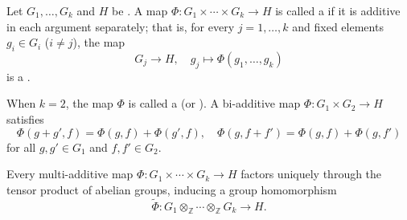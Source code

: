 \begin{definition} \label{definition:multi_additive_map_of_abelian_groups}
    Let $G_1, \ldots, G_k$ and $H$ be . A map $\Phi: G_1 \times \cdots \times G_k \to H$ is called a  if it is additive in each argument separately; that is, for every $j = 1,\ldots,k$ and fixed elements $g_i \in G_i$ ($i \neq j$), the map
    $$G_j \to H, \quad g_j \mapsto \Phi(g_1, \ldots, g_k)$$
    is a .

    When $k = 2$, the map $\Phi$ is called a  (or ). A bi-additive map $\Phi: G_1 \times G_2 \to H$ satisfies
    $$\Phi(g + g', f) = \Phi(g, f) + \Phi(g', f), \quad \Phi(g, f + f') = \Phi(g, f) + \Phi(g, f')$$
    for all $g, g' \in G_1$ and $f, f' \in G_2$.

    Every multi-additive map $\Phi: G_1 \times \cdots \times G_k \to H$ factors uniquely through the tensor product of abelian groups, inducing a group homomorphism
    $$\tilde{\Phi}: G_1 \otimes_{\mathbb{Z}} \cdots \otimes_{\mathbb{Z}} G_k \to H.$$
\end{definition}
